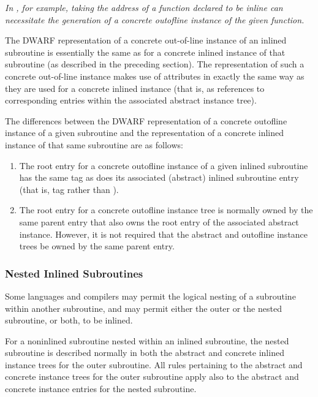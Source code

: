 \textit{In , for example, 
taking the address of a function declared
to be inline can necessitate the generation of a concrete
out\dash of\dash line instance of the given function.}

The DWARF representation of a concrete out-of-line instance
of an inlined subroutine is essentially the same as for a
concrete inlined instance of that subroutine (as described in
the preceding section). The representation of such a concrete
out-of-line 
instance 
\hypertarget{chap:DWATabstractoriginoutoflineinstance}{}
makes use of 
\DWATabstractoriginDEFN{}
attributes in exactly the same way as they are used for
a concrete inlined instance (that is, as references to
corresponding entries within the associated abstract instance
tree).

The differences between the DWARF representation of a
concrete out\dash of\dash line instance of a given subroutine and the
representation of a concrete inlined instance of that same
subroutine are as follows:
\begin{enumerate}[1. ]
\item  The root entry for a concrete out\dash of\dash line instance
of a given inlined subroutine has the same tag as does its
associated (abstract) inlined subroutine entry (that is, tag
\DWTAGsubprogram{} rather than \DWTAGinlinedsubroutine).

\item The root entry for a concrete out\dash of\dash line instance tree
is normally owned by the same parent entry that also owns
the root entry of the associated abstract instance. However,
it is not required that the abstract and out\dash of\dash line instance
trees be owned by the same parent entry.

\end{enumerate}

\subsubsection{Nested Inlined Subroutines}
\label{nestedinlinedsubroutines}
Some languages and compilers may permit the logical nesting of
a subroutine within another subroutine, and may permit either
the outer or the nested subroutine, or both, to be inlined.

For a non\dash inlined subroutine nested within an inlined
subroutine, the nested subroutine is described normally in
both the abstract and concrete inlined instance trees for
the outer subroutine. All rules pertaining to the abstract
and concrete instance trees for the outer subroutine apply
also to the abstract and concrete instance entries for the
nested subroutine.

